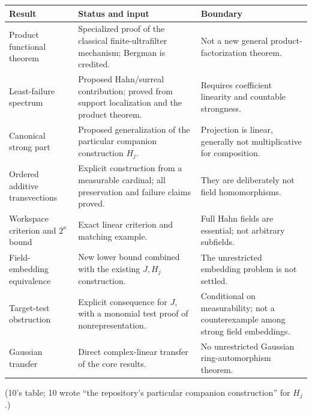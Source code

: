 \documentclass[11pt,letterpaper]{article}
\numberwithin{equation}{section}
\theoremstyle{definition}
\theoremstyle{remark}
\begin{document}
\begin{center}\small
\begin{longtable}{@{}P{0.24\textwidth}P{0.34\textwidth}P{0.34\textwidth}@{}}
\toprule
\textbf{Result} & \textbf{Status and input} & \textbf{Boundary}\\
\midrule\endhead
Product functional theorem & Specialized proof of the classical
finite-ultrafilter mechanism; Bergman is credited. & Not a new general
product-factorization theorem.\\[3pt]
Least-failure spectrum & Proposed Hahn/surreal contribution; proved from
support localization and the product theorem. & Requires coefficient
linearity and countable strongness.\\[3pt]
Canonical strong part & Proposed generalization of the particular companion
construction $H_j$. & Projection is linear, generally not multiplicative for
composition.\\[3pt]
Ordered additive transvections & Explicit construction from a measurable
cardinal; all preservation and failure claims proved. & They are
deliberately not field homomorphisms.\\[3pt]
Workspace criterion and $2^\kappa$ bound & Exact linear criterion and
matching example. & Full Hahn fields are essential; not arbitrary
subfields.\\[3pt]
Field-embedding equivalence & New lower bound combined with the existing
$J,H_j$ construction. & The unrestricted embedding problem is not
settled.\\[3pt]
Target-test obstruction & Explicit consequence for $J$, with a monomial test
proof of nonrepresentation. & Conditional on measurability; not a
counterexample among strong field embeddings.\\[3pt]
Gaussian transfer & Direct complex-linear transfer of the core results. & No
unrestricted Gaussian ring-automorphism theorem.\\
\bottomrule
\end{longtable}
\end{center}
(10's table; 10 wrote ``the repository's particular companion
construction'' for $H_j$.)
\end{document}
